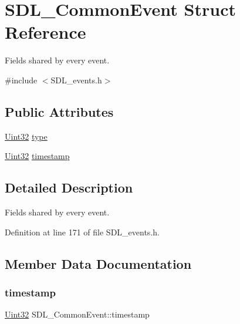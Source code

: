 \hypertarget{struct_s_d_l___common_event}{}\section{S\+D\+L\+\_\+\+Common\+Event Struct Reference}
\label{struct_s_d_l___common_event}


Fields shared by every event.  




{\ttfamily \#include $<$S\+D\+L\+\_\+events.\+h$>$}

\subsection*{Public Attributes}
\begin{DoxyCompactItemize}
\item 
\mbox{\hyperlink{_s_d_l__stdinc_8h_add440eff171ea5f55cb00c4a9ab8672d}{Uint32}} \mbox{\hyperlink{struct_s_d_l___common_event_a4ecd888325355321b42b2e2956f27453}{type}}
\item 
\mbox{\hyperlink{_s_d_l__stdinc_8h_add440eff171ea5f55cb00c4a9ab8672d}{Uint32}} \mbox{\hyperlink{struct_s_d_l___common_event_a7d9046abb021ffc88dd5d32978289e65}{timestamp}}
\end{DoxyCompactItemize}


\subsection{Detailed Description}
Fields shared by every event. 

Definition at line 171 of file S\+D\+L\+\_\+events.\+h.



\subsection{Member Data Documentation}
\mbox{\label{struct_s_d_l___common_event_a7d9046abb021ffc88dd5d32978289e65}} 
\subsubsection{\texorpdfstring{timestamp}{timestamp}}
{\footnotesize\ttfamily \mbox{\hyperlink{_s_d_l__stdinc_8h_add440eff171ea5f55cb00c4a9ab8672d}{Uint32}} S\+D\+L\+\_\+\+Common\+Event\+::timestamp}

